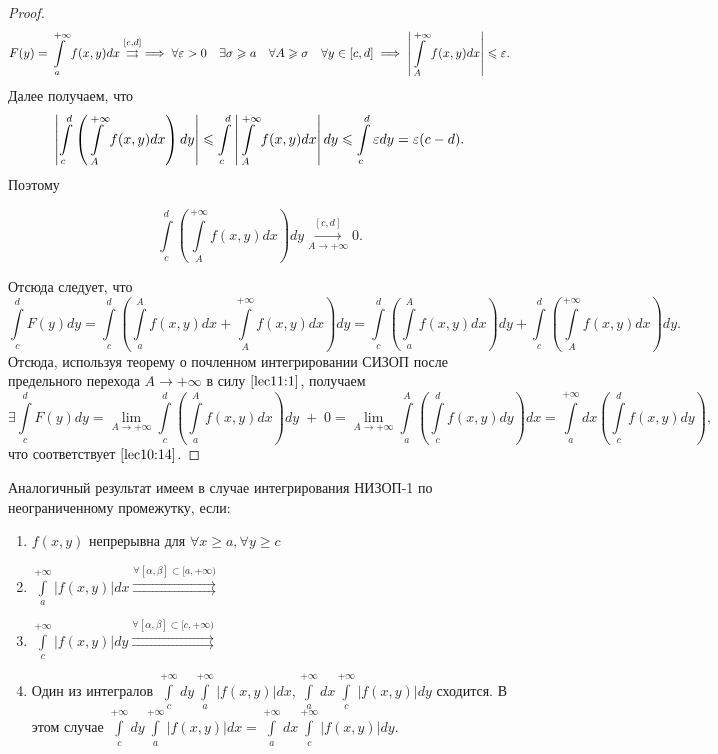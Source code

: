 \documentclass[../../main.tex]{subfiles}
\begin{document}
\begin{proof}
	\[F(y) = \int\limits_a^{+\infty} f(x, y)dx \overset{[c, d]}\rightrightarrows 
	\implies
	\forall \varepsilon > 0 \quad \exists \sigma \geqslant a \quad \forall A \geqslant \sigma 
	\quad \forall y \in [c, d] \implies \left|\int\limits_A^{+\infty}f(x, y) dx 
	\right| \leqslant \varepsilon.\]
	Далее получаем, что 
	\[ \left| \int\limits_c^d\left(\int\limits_A^{+\infty}f(x, y)dx\right) 
	dy\right| 
	\leqslant \int\limits_c^d\left|\int\limits_A^{+\infty}f(x, y)dx\right| dy
	\leqslant \int\limits_c^d \varepsilon dy = \varepsilon(c - d).\]
	Поэтому 
	
	\begin{equation} \label{lec11:1}
		\int\limits_c^d \left( \int\limits_A^{+\infty} f(x, y) dx \right) dy 
		\overset{[c, d]}{\underset{A \rightarrow +\infty}\longrightarrow} 0.
	\end{equation}
	
	Отсюда следует, что
	\[
	\int\limits_c^d F(y)dy = \int\limits_c^d \left( \int\limits_a^A f(x, y)dx + 
	\int\limits_A^{+\infty} f(x, y) dx \right) dy = \int\limits_c^d \left( 
	\int\limits_a^A f(x, y) dx \right) dy + \int\limits_c^d \left( 
	\int\limits_A^{+\infty} f(x, y) dx \right) dy.
	\]
	Отсюда, используя теорему о почленном интегрировании СИЗОП после предельного 
	перехода $A \longrightarrow +\infty$ в силу $\eqref{lec11:1}$, получаем 
	\[
	\exists \int\limits_c^d F(y) dy = \lim_{A \rightarrow +\infty} 
	\int\limits_c^d \left( \int\limits_a^A f(x, y) dx \right) dy \; + \; 0 
	= \lim_{A \rightarrow +\infty} \int\limits_a^A \left( \int\limits_c^d f(x, y) 
	dy \right) dx 
	= \int\limits_a^{+\infty} dx \left( \int\limits_c^d f(x, y) dy \right),
	\] что соответствует $\eqref{lec10:14}$.
\end{proof}

\begin{rem}
	Аналогичный результат имеем в случае интегрирования НИЗОП-1 по 
	неограниченному промежутку, если:
	\begin{enumerate}
		\item $\displaystyle f(x, y)$ непрерывна для $\forall x \geq a, \forall y 
		\geq c$
		\item $\displaystyle \int\limits_a^{+\infty} \left| f(x, y) \right| dx 
		\overset{\forall [\alpha, \beta] \subset [a, +\infty) }\rightrightarrows$
		\item $\displaystyle \int\limits_c^{+\infty} \left| f(x, y) \right| dy 
		\overset{\forall [\alpha, \beta] \subset [c, +\infty) }\rightrightarrows$
		\item Один из интегралов $\displaystyle \int\limits_c^{+\infty} dy 
		\int\limits_a^{+\infty} \left|f(x, y)\right| dx,
		\int\limits_a^{+\infty} dx \int\limits_c^{+\infty} \left|f(x, y)\right| dy$
		сходится. В этом случае
		$\displaystyle \int\limits_c^{+\infty} dy \int\limits_a^{+\infty} \left|f(x, 
		y)\right| dx = \int\limits_a^{+\infty} dx \int\limits_c^{+\infty} \left|f(x, 
		y)\right| dy$.
	\end{enumerate}
\end{rem}
\end{document}
